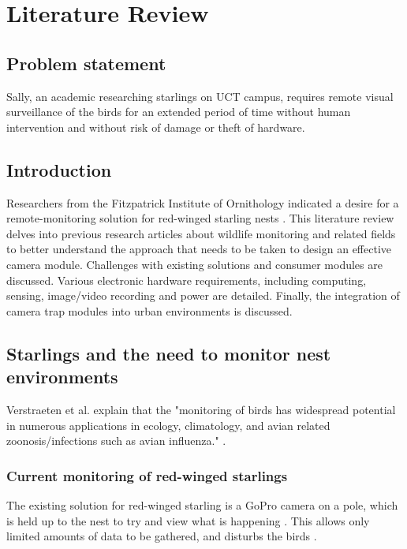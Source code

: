 \chapter{Literature Review \label{ch:literature}}
\section{Problem statement}

Sally, an academic researching starlings on UCT campus, requires remote visual surveillance of the birds for an extended period of time without human intervention and without risk of damage or theft of hardware.

\section{Introduction}

Researchers from the Fitzpatrick Institute of Ornithology indicated a desire for a remote-monitoring solution for red-winged starling nests \cite{hofmeyer2024private}. This literature review delves into previous research articles about wildlife monitoring and related fields to better understand the approach that needs to be taken to design an effective camera module. Challenges with existing solutions and consumer modules are discussed. Various electronic hardware requirements, including computing, sensing, image/video recording and power are detailed. Finally, the integration of camera trap modules into urban environments is discussed.

\section{Starlings and the need to monitor nest environments}

Verstraeten et al. explain that the "monitoring of birds has widespread potential in numerous applications in ecology, climatology, and avian related zoonosis/infections such as avian influenza." \cite{verstraeten2010webcams}.

\subsection{Current monitoring of red-winged starlings}

The existing solution for red-winged starling is a GoPro camera on a pole, which is held up to the nest to try and view what is happening \cite{hofmeyer2024private}. This allows only limited amounts of data to be gathered, and disturbs the birds \cite{hofmeyer2024private}.


